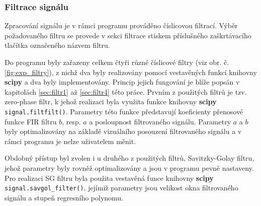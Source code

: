 \documentclass[a4paper, 12pt]{article}
\begin{document}
\subsubsection{Filtrace signálu}\label{sec:exp_filtrace}
Zpracování signálu je v rámci programu prováděno číslicovou filtrací. Výběr požadovaného filtru se provede v sekci filtrace stiskem příslušného zaškrtávacího tlačítka označeného názvem filtru.

\noindent Do programu byly zařazeny celkem čtyři různé číslicové filtry (viz obr. č. \ref{fig:exp_filtry}), z nichž dva byly realizovány pomocí vestavěných funkcí knihovny \textbf{scipy} a dva byly implementovány. Princip jejich fungování je blíže popsán v kapitolách \ref{sec:filtr1} až \ref{sec:filtr4} této práce.
\vskip 0.1in
\noindent Prvním z použitých filtrů je tzv. zero-phase filtr, k jehož realizaci byla využita funkce knihovny \textbf{scipy} \texttt{signal.filtfilt()}. Parametry této funkce představují koeficienty přenosové funkce FIR filtru $b$, resp. $a$ a posloupnost filtrovaného signálu. Parametry $a$ a $b$ byly optimalizovány na základě vizuálního posouzení filtrovaného signálu a v rámci programu je nelze uživatelem měnit.

Obdobný přístup byl zvolen i u druhého z použitých filtrů, Savitzky-Golay filtru, jehož parametry byly rovněž optimalizovány a jsou v programu pevně nastaveny. Pro realizaci SG filtru byla použita vestavěná funce knihovny \textbf{scipy} \texttt{signal.savgol}\verb|_|\texttt{filter()}, jejímiž parametry jsou velikost okna filtrovaného signálu a stupeň regresního polynomu.
\end{document}
